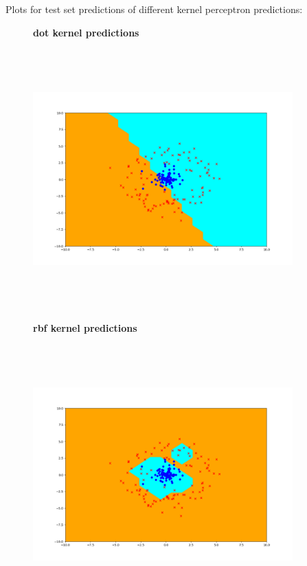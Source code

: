 \begin{answer}
Plots for test set predictions of different kernel perceptron predictions:

\begin{figure}[H]
	\textbf{dot kernel predictions}\par\medskip
	\includegraphics[width=10cm,height=10cm,keepaspectratio]{../src/perceptron/perceptron_dot_output.png}
\end{figure}

\begin{figure}[H]
	\textbf{rbf kernel predictions}\par\medskip
	\includegraphics[width=10cm,height=10cm,keepaspectratio]{../src/perceptron/perceptron_rbf_output.png}
\end{figure}


\end{answer}
